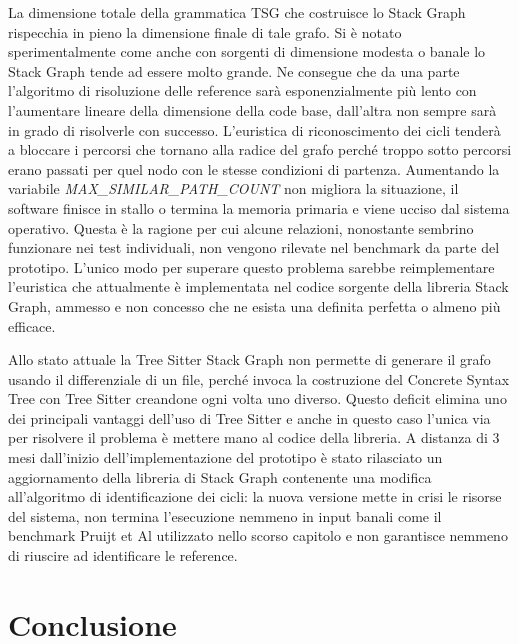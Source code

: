 La dimensione totale della grammatica TSG che costruisce lo Stack Graph rispecchia in pieno la dimensione finale di tale grafo. Si \`e notato sperimentalmente come anche con sorgenti di dimensione modesta o banale lo Stack Graph tende ad essere molto grande. Ne consegue che da una parte l'algoritmo di risoluzione delle reference sar\`a esponenzialmente pi\`u lento con l'aumentare lineare della dimensione della code base, dall'altra non sempre sar\`a in grado di risolverle con successo. L'euristica di riconoscimento dei cicli tender\`a a bloccare i percorsi che tornano alla radice del grafo perch\'e troppo sotto percorsi erano passati per quel nodo con le stesse condizioni di partenza. Aumentando la variabile \emph{MAX\_SIMILAR\_PATH\_COUNT} non migliora la situazione, il software finisce in stallo o termina la memoria primaria e viene ucciso dal sistema operativo. Questa \`e la ragione per cui alcune relazioni, nonostante sembrino funzionare nei test individuali, non vengono rilevate nel benchmark da parte del prototipo. L'unico modo per superare questo problema sarebbe reimplementare l'euristica che attualmente \`e implementata nel codice sorgente della libreria Stack Graph, ammesso e non concesso che ne esista una definita perfetta o almeno pi\`u efficace.


Allo stato attuale la Tree Sitter Stack Graph non permette di generare il grafo usando il differenziale di un file, perch\'e invoca la costruzione del Concrete Syntax Tree con Tree Sitter creandone ogni volta uno diverso. Questo deficit elimina uno dei principali vantaggi dell'uso di Tree Sitter e anche in questo caso l'unica via per risolvere il problema \`e mettere mano al codice della libreria. A distanza di 3 mesi dall'inizio dell'implementazione del prototipo \`e stato rilasciato un aggiornamento della libreria di Stack Graph contenente una modifica all'algoritmo di identificazione dei cicli: la nuova versione mette in crisi le risorse del sistema, non termina l'esecuzione nemmeno in input banali come il benchmark Pruijt et Al utilizzato nello scorso capitolo e non garantisce nemmeno di riuscire ad identificare le reference.

\section{Conclusione}

